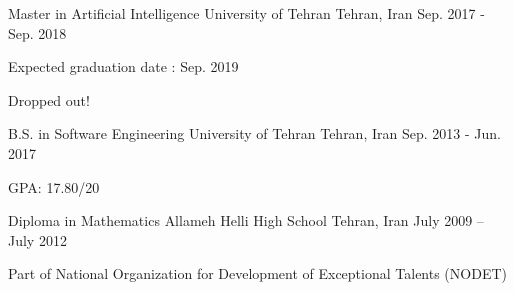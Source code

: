 

\begin{cventries}
  
  \cventry
    {Master in Artificial Intelligence} %
    {University of Tehran} %
    {Tehran, Iran} %
    {Sep. 2017 - Sep. 2018} %
    {
      \begin{cvitems} %
        \item {Expected graduation date : Sep. 2019}
        \item {Dropped out!}
      \end{cvitems}
    }
  \cventry
    {B.S. in Software Engineering} %
    {University of Tehran} %
    {Tehran, Iran} %
    {Sep. 2013 - Jun. 2017} %
    {
      \begin{cvitems} %
        \item {GPA: 17.80/20}
      \end{cvitems}
    }
    
  \cventry
  	{Diploma in Mathematics}
  	{Allameh Helli High School}
  	{Tehran, Iran}
  	{July 2009 – July 2012}
  	{
      \begin{cvitems} %
        \item {Part of National Organization for Development of Exceptional Talents (NODET)}
      \end{cvitems}
    }

\end{cventries}
